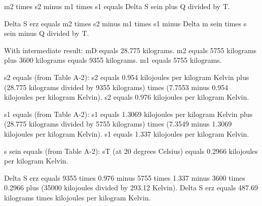 m2 times s2 minus m1 times s1 equals Delta S sein plus Q divided by T.  

Delta S erz equals m2 times s2 minus m1 times s1 minus Delta m sein times s sein minus Q divided by T.  

With intermediate result:  
mD equals 28.775 kilograms.  
m2 equals 5755 kilograms plus 3600 kilograms equals 9355 kilograms.  
m1 equals 5755 kilograms.  

s2 equals (from Table A-2):  
s2 equals 0.954 kilojoules per kilogram Kelvin plus (28.775 kilograms divided by 9355 kilograms) times (7.7553 minus 0.954 kilojoules per kilogram Kelvin).  
s2 equals 0.976 kilojoules per kilogram Kelvin.  

s1 equals (from Table A-2):  
s1 equals 1.3069 kilojoules per kilogram Kelvin plus (28.775 kilograms divided by 5755 kilograms) times (7.3549 minus 1.3069 kilojoules per kilogram Kelvin).  
s1 equals 1.337 kilojoules per kilogram Kelvin.  

s sein equals (from Table A-2):  
sT (at 20 degrees Celsius) equals 0.2966 kilojoules per kilogram Kelvin.  

Delta S erz equals 9355 times 0.976 minus 5755 times 1.337 minus 3600 times 0.2966 plus (35000 kilojoules divided by 293.12 Kelvin).  
Delta S erz equals 487.69 kilograms times kilojoules per kilogram Kelvin.